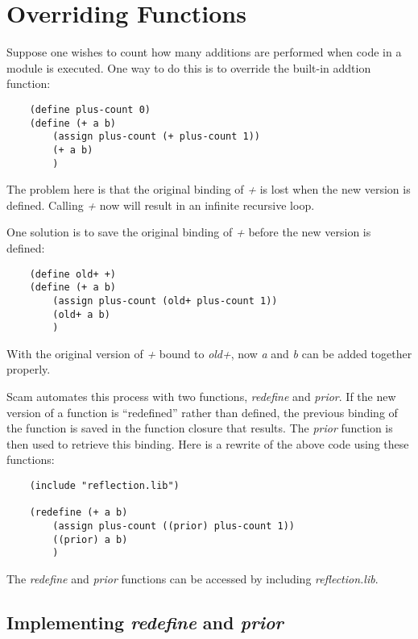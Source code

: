 \chapter{Overriding Functions}
\label{OverridingFunctions}

Suppose one wishes to count how many additions are performed when
code in a module is executed. One way to do this is to override
the built-in addtion function:

\begin{verbatim}
    (define plus-count 0)
    (define (+ a b)
        (assign plus-count (+ plus-count 1))
        (+ a b)
        )
\end{verbatim}

The problem here is that the original binding of {\it +} is lost when the 
new version is defined.
Calling {\it +} now will result in an infinite recursive
loop.

One solution is to save the original binding of {\it +} before the new version
is defined:

\begin{verbatim}
    (define old+ +)
    (define (+ a b)
        (assign plus-count (old+ plus-count 1))
        (old+ a b)
        )
\end{verbatim}

With the original version of {\it +} bound to {\it old+},
now {\it a} and {\it b} can be added
together properly.
    
Scam automates this process with two functions, {\it redefine} and {\it prior}.
If the new version of a function is ``redefined'' rather than defined,
the previous
binding of the function is saved in the function closure that results.
The {\it prior} function 
is then used to retrieve this binding. Here is a rewrite
of the above code using these functions:

\begin{verbatim}
    (include "reflection.lib")

    (redefine (+ a b)
        (assign plus-count ((prior) plus-count 1))
        ((prior) a b)
        )
\end{verbatim}

The {\it redefine} and {\it prior} functions can be accessed by including
{\it reflection.lib}.
    
\section{Implementing {\it redefine} and {\it prior}}

